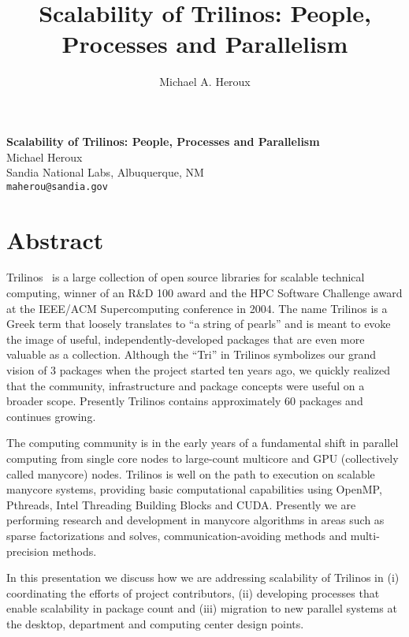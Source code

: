 \title{Scalability of Trilinos: People, Processes and Parallelism}
\author{Michael A. Heroux} 

\begin{center}

\textbf{\Large Scalability of Trilinos: People, Processes and Parallelism}\\
\vspace{10mm}
{\large Michael Heroux}\\
Sandia National Labs, Albuquerque, NM\\
{\tt maherou@sandia.gov}

\end{center}

\section*{Abstract}

Trilinos~\cite{trilinoshomepage,Trilinos-Overview-TOMS} is a large collection of open source libraries for scalable technical computing, winner of an R\&D 100 award and the HPC Software Challenge award at the IEEE/ACM Supercomputing conference in 2004.  The name Trilinos is a Greek term that loosely translates to ``a string of pearls'' and is meant to evoke the image of useful, independently-developed packages that are even more valuable as a collection.  Although the ``Tri'' in Trilinos symbolizes our grand vision of 3 packages when the project started ten years ago, we quickly realized that the community, infrastructure and package concepts were useful on a broader scope.  Presently Trilinos contains approximately 60 packages and continues growing.  

The computing community is in the early years of a fundamental shift in parallel computing from single core nodes to large-count multicore and GPU (collectively called manycore) nodes.  Trilinos is well on the path to execution on scalable manycore systems, providing basic computational capabilities using OpenMP, Pthreads, Intel Threading Building Blocks and CUDA.  Presently we are performing research and development in manycore algorithms in areas such as sparse factorizations and solves, communication-avoiding methods and multi-precision methods.

In this presentation we discuss how we are addressing scalability of Trilinos in (i) coordinating the efforts of project contributors, (ii) developing processes that enable scalability in package count and (iii) migration to new parallel systems at the desktop, department and computing center design points.

